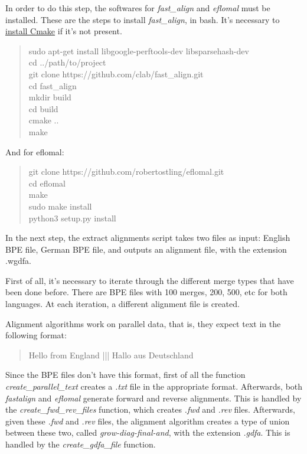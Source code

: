 In order to do this step, the softwares for \emph{fast\_align} and \emph{eflomal} must be installed. These are the steps to install \emph{fast\_align}, in bash. It's necessary to \href{https://cmake.org/install/}{install Cmake} if it's not present.

\begin{quote}
  sudo apt-get install libgoogle-perftools-dev libsparsehash-dev\\
  cd ../path/to/project\\
  git clone https://github.com/clab/fast\_align.git\\
  cd fast\_align\\
  mkdir build\\
  cd build\\
  cmake ..\\
  make
\end{quote}

And for eflomal:

\begin{quote}
  git clone https://github.com/robertostling/eflomal.git\\
  cd eflomal\\
  make\\
  sudo make install\\
  python3 setup.py install
\end{quote}

In the next step, the extract alignments script takes two files as input: English BPE file, German BPE file, and outputs an alignment file, with the extension .wgdfa.

First of all, it's necessary to iterate through the different merge types that have been done before. There are BPE files with 100 merges, 200, 500, etc for both languages. At each iteration, a different alignment file is created.

Alignment algorithms work on parallel data, that is, they expect text in the following format:

\begin{quote}
  Hello from England ||| Hallo aus Deutschland
\end{quote}

Since the BPE files don't have this format, first of all the function \emph{create\_parallel\_text} creates a \emph{.txt} file in the appropriate format. Afterwards, both \emph{fastalign} and \emph{eflomal} generate forward and reverse alignments. This is handled by the \emph{create\_fwd\_rev\_files} function, which creates \emph{.fwd} and \emph{.rev} files. Afterwards, given these \emph{.fwd} and \emph{.rev} files, the alignment algorithm creates a type of union between these two, called \emph{grow-diag-final-and}, with the extension \emph{.gdfa}. This is handled by the \emph{create\_gdfa\_file} function.

